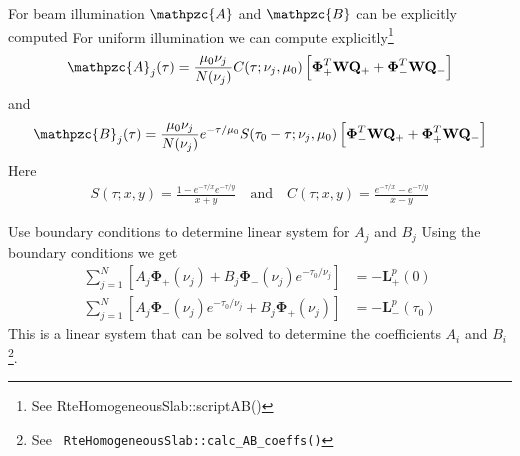 \documentclass{beamer}
\newcommand{\mvec}[1]{\mathbf{#1}}
\newcommand{\gvec}[1]{\boldsymbol{#1}}
\newcommand{\script}[1]{\mathpzc{#1}}
\begin{document}
\begin{frame}{For beam illumination $\script{A}$ and $\script{B}$ can
    be explicitly computed}
  For uniform illumination we can compute explicitly\footnote{See
    RteHomogeneousSlab::scriptAB()}
  \begin{align}
    \script{A}_j(\tau) = \frac{\mu_0 \nu_j}{N(\nu_j)}
    C(\tau ; \nu_j, \mu_0)
    \left[
      \gvec{\Phi}_+^T \mvec{W} \mvec{Q}_+ +
      \gvec{\Phi}_-^T \mvec{W} \mvec{Q}_-
    \right]
  \end{align}
  and
  \begin{align}
    \script{B}_j(\tau) = \frac{\mu_0 \nu_j}{N(\nu_j)}
    e^{-\tau/\mu_0}S(\tau_0-\tau ; \nu_j, \mu_0)
    \left[
      \gvec{\Phi}_-^T \mvec{W} \mvec{Q}_+ +
      \gvec{\Phi}_+^T \mvec{W} \mvec{Q}_-
    \right]
  \end{align}
  Here
  \begin{align}
    S(\tau;x,y) = \frac{1-e^{-\tau/x}e^{-\tau/y}}{x+y} \quad\textrm{and}\quad
    C(\tau;x,y) = \frac{e^{-\tau/x}-e^{-\tau/y}}{x-y}
  \end{align}
\end{frame}

\begin{frame}{Use boundary conditions to determine linear system for
    $A_j$ and $B_j$}
  Using the boundary conditions we get
  \begin{align}
    \sum_{j=1}^N
    \left[
      A_j \gvec{\Phi}_+(\nu_j) +
      B_j \gvec{\Phi}_-(\nu_j) e^{-\tau_0/\nu_j}
    \right]
    &= -\mvec{L}_+^p(0) \\
    \sum_{j=1}^N
    \left[
      A_j \gvec{\Phi}_-(\nu_j) e^{-\tau_0/\nu_j} +
      B_j \gvec{\Phi}_+(\nu_j)
    \right]
    &= -\mvec{L}_-^p(\tau_0)
  \end{align}
  This is a linear system that can be solved to determine the
  coefficients $A_i$ and $B_i$\footnote{See {\tt
      RteHomogeneousSlab::calc\_AB\_coeffs()}}.

\end{frame}
\end{document}
